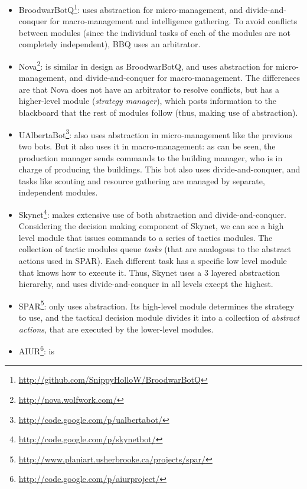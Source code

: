 \documentclass[journal]{IEEEtran}
\begin{document}
\begin{itemize}
\item
  BroodwarBotQ\footnote{\url{http://github.com/SnippyHolloW/BroodwarBotQ}}:
  uses  abstraction for  micro-management, and  divide-and-conquer for
  macro-management  and  intelligence  gathering. To  avoid  conflicts
  between modules (since  the individual tasks of each  of the modules
  are not completely independent), BBQ uses an arbitrator.
\item  Nova\footnote{\url{http://nova.wolfwork.com/}}:  is similar  in
  design as  BroodwarBotQ, and uses  abstraction for micro-management,
  and  divide-and-conquer for  macro-management.  The differences  are
  that Nova does not have  an arbitrator to resolve conflicts, but has
  a  higher-level   module  ({\em  strategy   manager}),  which  posts
  information to the blackboard that the rest of modules follow (thus,
  making use of abstraction).
\item
  UAlbertaBot\footnote{\url{http://code.google.com/p/ualbertabot/}}:
  also  uses abstraction  in  micro-management like  the previous  two
  bots. But it  also uses it in macro-management: as  can be seen, the
  production manager sends commands to the building manager, who is in
  charge   of   producing   the   buildings.  This   bot   also   uses
  divide-and-conquer, and  tasks like scouting  and resource gathering
  are managed by separate, independent modules.
\item       Skynet\footnote{\url{http://code.google.com/p/skynetbot/}}:
  makes     extensive     use      of     both     abstraction     and
  divide-and-conquer.  Considering the  decision  making component  of
  Skynet, we  can see a  high level module  that issues commands  to a
  series of  tactics modules. The  collection of tactic  modules queue
  {\em  tasks} (that  are analogous  to the  abstract actions  used in
  SPAR).  Each different  task has  a specific  low level  module that
  knows how to  execute it. Thus, Skynet uses  a 3 layered abstraction
  hierarchy,  and uses  divide-and-conquer  in all  levels except  the
  highest.
\item
  SPAR\footnote{\url{http://www.planiart.usherbrooke.ca/projects/spar/}}:
  only uses abstraction. Its high-level module determines the strategy
  to  use,  and  the  tactical  decision  module  divides  it  into  a
  collection  of {\em  abstract  actions}, that  are  executed by  the
  lower-level modules.
\item  AIUR\footnote{\url{http://code.google.com/p/aiurproject/}}:  is

\end{itemize}
\end{document}
